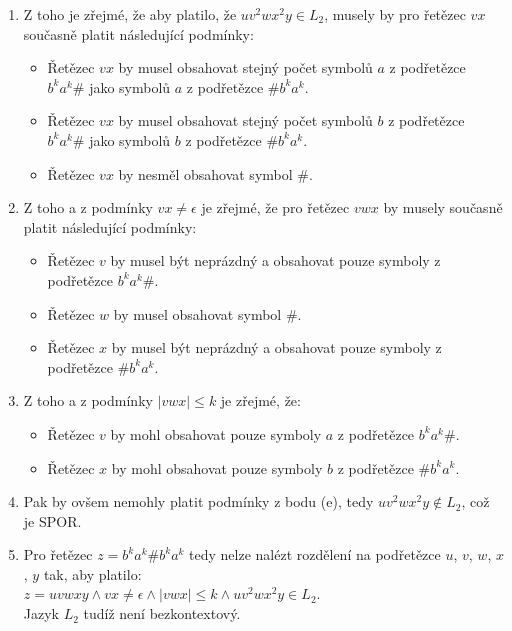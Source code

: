 \documentclass[a4paper,11pt]{article}[24.3.2010]
\begin{document}
\begin{enumerate}
\begin{enumerate}
\item Z toho je zřejmé, že aby platilo, že $uv^{2}wx^{2}y \in L_{2}$, musely by pro řetězec $vx$ současně platit následující podmínky:
\begin{itemize}
\item Řetězec $vx$ by musel obsahovat stejný počet symbolů $a$ z podřetězce $b^{k}a^{k}\#$ jako symbolů $a$ z podřetězce $\#b^{k}a^{k}$.
\item Řetězec $vx$ by musel obsahovat stejný počet symbolů $b$ z podřetězce $b^{k}a^{k}\#$ jako symbolů $b$ z podřetězce $\#b^{k}a^{k}$.
\item Řetězec $vx$ by nesměl obsahovat symbol $\#$.\\
\end{itemize}

\item Z toho a z podmínky $vx \neq \epsilon$ je zřejmé, že pro řetězec $vwx$ by musely současně platit následující podmínky:
\begin{itemize}
\item Řetězec $v$ by musel být neprázdný a obsahovat pouze symboly z podřetězce $b^{k}a^{k}\#$.
\item Řetězec $w$ by musel obsahovat symbol $\#$.
\item Řetězec $x$ by musel být neprázdný a obsahovat pouze symboly z podřetězce $\#b^{k}a^{k}$.\\
\end{itemize}

\item Z toho a z podmínky $|vwx| \leq k$ je zřejmé, že:
\begin{itemize}
\item Řetězec $v$ by mohl obsahovat pouze symboly $a$ z podřetězce $b^{k}a^{k}\#$.
\item Řetězec $x$ by mohl obsahovat pouze symboly $b$ z podřetězce $\#b^{k}a^{k}$.\\
\end{itemize}

\item Pak by ovšem nemohly platit podmínky z bodu (e), tedy $uv^{2}wx^{2}y \notin L_{2}$, což je SPOR.\\
\item Pro řetězec $z = b^{k}a^{k}\#b^{k}a^{k}$ tedy nelze nalézt rozdělení na podřetězce $u$, $v$, $w$, $x$, $y$ tak, aby platilo:\\
$z = uvwxy \wedge vx \neq \epsilon \wedge |vwx| \leq k \wedge uv^{2}wx^{2}y \in L_{2}$.\\
Jazyk $L_{2}$ tudíž není bezkontextový.


\end{enumerate}
\end{enumerate}
\end{document}
